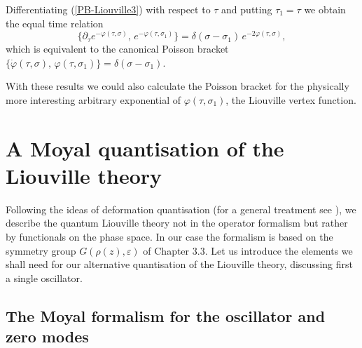 \documentclass[a4paper,12pt]{article}
\begin{document}
\noindent
Differentiating (\ref{PB-Liouville3}) with respect to
$\tau $ and putting $\tau_1=\tau$ we obtain the equal time relation
\begin{equation}\label{canonical-PB}
\{ \partial_\tau e^{-\varphi(\tau, \sigma)},\,e^{-\varphi (\tau, \sigma_1)}\}=
\delta(\sigma-\sigma_1)\, e^{-2\varphi(\tau, \sigma)},
\end{equation}
which is equivalent to the canonical Poisson bracket \,
$\{ \dot\varphi(\tau, \sigma),\,\varphi (\tau, \sigma_1)\}=
\delta(\sigma-\sigma_1)$.

\noindent
With these results we could also calculate the Poisson bracket for
the physically more interesting arbitrary exponential of $\varphi
(\tau, \sigma_1)$, the Liouville vertex function.



\setcounter{equation}{0}
\section{A Moyal quantisation of the Liouville theory}

Following the ideas of deformation quantisation (for a general
treatment see \cite{Flato, Reuter}), we describe the quantum Liouville
theory not in the operator formalism but rather by functionals on the
phase space. In our case the formalism is based on the symmetry group
$G(\rho(z),\varepsilon )$ of Chapter $3.3$. Let us introduce the
elements we shall need  for our alternative quantisation of
the Liouville theory, discussing first a single oscillator.


\subsection{ The Moyal formalism for the oscillator and zero modes}
\end{document}
